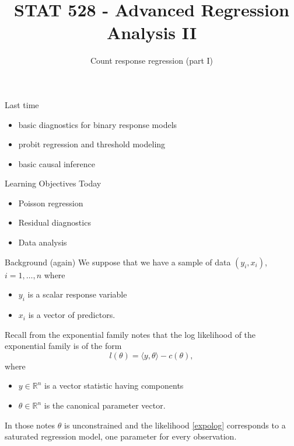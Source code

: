 \documentclass[
  ignorenonframetext,
]{beamer}
\title{STAT 528 - Advanced Regression Analysis II}
\author{Count response regression (part I)}
\date{}
\institute{Daniel J. Eck\\
Department of Statistics\\
University of Illinois}
\providecommand{\tightlist}{%
  \setlength{\itemsep}{0pt}\setlength{\parskip}{0pt}}
\begin{document}
\frame{\titlepage}

\begin{frame}
\newcommand{\R}{\mathbb{R}}
\newcommand{\Prob}{\mathbb{P}}
\newcommand{\Proj}{\textbf{P}}
\newcommand{\Hcal}{\mathcal{H}}
\newcommand{\rootn}{\sqrt{n}}
\newcommand{\p}{\mathbf{p}}
\newcommand{\E}{\text{E}}
\newcommand{\Var}{\text{Var}}
\newcommand{\Cov}{\text{Cov}}
\newcommand{\mubf}{\bm{\mu}}
\newcommand{\logit}{\text{logit}}

\newtheorem{cor}{Corollary}
\newtheorem{lem}{Lemma}
\newtheorem{thm}{Theorem}
\newtheorem{defn}{Definition}
\newtheorem{prop}{Proposition}
\end{frame}

\begin{frame}{Last time}
\protect\hypertarget{last-time}{}
\begin{itemize}
\tightlist
\item
  basic diagnostics for binary response models
\item
  probit regression and threshold modeling
\item
  basic causal inference
\end{itemize}
\end{frame}

\begin{frame}{Learning Objectives Today}
\protect\hypertarget{learning-objectives-today}{}
\begin{itemize}
\tightlist
\item
  Poisson regression
\item
  Residual diagnostics
\item
  Data analysis
\end{itemize}
\end{frame}

\begin{frame}{Background (again)}
\protect\hypertarget{background-again}{}
We suppose that we have a sample of data \((y_i,x_i)\),
\(i = 1,\ldots, n\) where

\begin{itemize}
\tightlist
\item
  \(y_i\) is a scalar response variable
\item
  \(x_i\) is a vector of predictors.
\end{itemize}

Recall from the exponential family notes that the log likelihood of the
exponential family is of the form \begin{equation} \label{expolog}
    l(\theta) = \langle y, \theta \rangle - c(\theta),
\end{equation} where

\begin{itemize}
\tightlist
\item
  \(y \in \mathbb{R}^n\) is a vector statistic having components
\item
  \(\theta \in \mathbb{R}^n\) is the canonical parameter vector.
\end{itemize}

In those notes \(\theta\) is unconstrained and the likelihood
\eqref{expolog} corresponds to a saturated regression model, one
parameter for every observation.
\end{frame}
\end{document}
